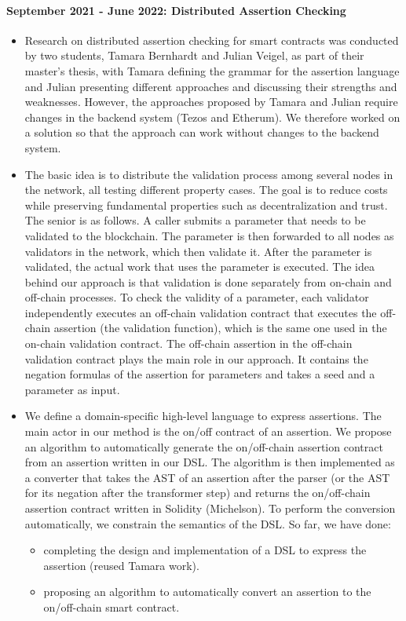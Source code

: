 \documentclass[a4paper,11pt]{article}
\begin{document}
\paragraph{September 2021 - June 2022: Distributed  Assertion Checking}
\begin{itemize}
\item Research on distributed assertion checking for smart contracts was conducted by two students, Tamara Bernhardt and Julian Veigel, as part of their master's thesis, with Tamara defining the grammar for the assertion language and Julian presenting different approaches and discussing their strengths and weaknesses. However, the approaches proposed by Tamara and Julian require changes  in the backend system (Tezos and Etherum). We therefore worked on a solution so that the approach can work without changes to the backend system.
\item 
The basic idea is to distribute the validation process among several nodes in the network, all testing different property cases. The goal is to reduce costs while preserving fundamental properties such as decentralization and trust. The senior is as follows. A caller submits a parameter that needs to be validated to the blockchain. The parameter is then forwarded to all nodes as validators in the network, which then validate it. After the parameter is validated, the actual work that uses the parameter is executed. The idea behind our approach is that validation is done separately from on-chain and off-chain processes. To check the validity of a parameter, each validator independently executes an off-chain validation contract that executes the off-chain assertion (the validation function), which is the same one used in the on-chain validation contract. The off-chain assertion in the off-chain validation contract plays the main role in our approach. It contains the negation formulas of the assertion for parameters and takes a seed and a parameter as input. 

\item We define a domain-specific high-level language to express assertions. The main actor in our method is the on/off contract of an assertion. We propose an algorithm to automatically generate the on/off-chain assertion contract from an assertion written in our DSL. The algorithm is then implemented as a converter that takes the AST of an assertion after the parser (or the AST for its negation after the transformer step) and returns the on/off-chain assertion contract written in Solidity (Michelson). To perform the conversion automatically, we constrain the semantics of the DSL. So far, we have done:
\begin{itemize}
\item completing the design and implementation of a DSL to express the assertion (reused Tamara work).
\item proposing an algorithm to automatically convert an assertion to the on/off-chain smart contract.
\end{itemize}


\end{itemize}  
\end{document}
